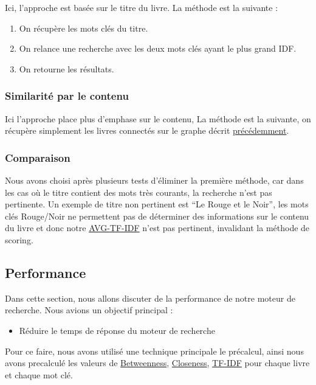 \documentclass[
  12pt,
]{article}
\providecommand{\tightlist}{%
  \setlength{\itemsep}{0pt}\setlength{\parskip}{0pt}}
\begin{document}
Ici, l'approche est basée sur le titre du livre. La méthode est la
suivante :

\begin{enumerate}
\def\labelenumi{\arabic{enumi}.}
\tightlist
\item
  On récupère les mots clés du titre.
\item
  On relance une recherche avec les deux mots clés ayant le plus grand
  IDF.
\item
  On retourne les résultats.
\end{enumerate}

\subsubsection{Similarité par le
contenu}\label{similarituxe9-par-le-contenu}

Ici l'approche place plus d'emphase sur le contenu, La méthode est la
suivante, on récupère simplement les livres connectés sur le graphe
décrit \hyperref[heuristiques]{précédemment}.

\subsubsection{Comparaison}\label{comparaison}

Nous avons choisi après plusieurs tests d'éliminer la première méthode,
car dans les cas où le titre contient des mots très courants, la
recherche n'est pas pertinente. Un exemple de titre non pertinent est
``Le Rouge et le Noir'', les mots clés Rouge/Noir ne permettent pas de
déterminer des informations sur le contenu du livre et donc notre
\hyperref[heuristiques]{AVG-TF-IDF} n'est pas pertinent, invalidant la
méthode de scoring.

\subsection{Performance}\label{performance}

Dans cette section, nous allons discuter de la performance de notre
moteur de recherche. Nous avions un objectif principal :

\begin{itemize}
\tightlist
\item
  Réduire le temps de réponse du moteur de recherche
\end{itemize}

Pour ce faire, nous avons utilisé une technique principale le précalcul,
ainsi nous avons precalculé les valeurs de
\hyperref[heuristiques]{Betweenness},
\hyperref[heuristiques]{Closeness}, \hyperref[heuristiques]{TF-IDF} pour
chaque livre et chaque mot clé.
\end{document}
